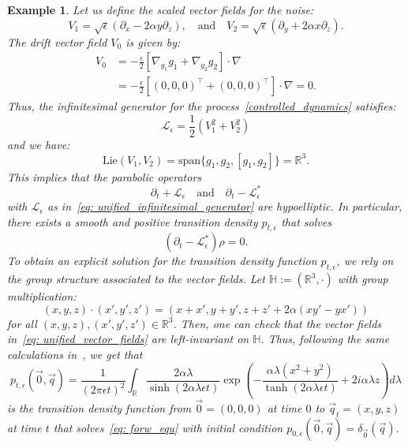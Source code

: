 \documentclass{amsart}
\newtheorem{example}[theorem]{Example}
\numberwithin{equation}{section}
\begin{document}
\begin{example}
{Let us define the scaled vector fields for the noise:
\begin{equation*}
V_1 = \sqrt{\epsilon}(\partial_x - 2\alpha y\partial_z), \quad\text{and}\quad 
V_2 = \sqrt{\epsilon}(\partial_y + 2\alpha x\partial_z).
\end{equation*}
The drift vector field $V_0$ is given by:
\begin{align*}
V_0 &= -\frac{\epsilon}{2}[\nabla_{g_1}g_1 + \nabla_{g_2}g_2]\cdot\nabla \\
&= -\frac{\epsilon}{2}[(0,0,0)^\top + (0,0,0)^\top]\cdot\nabla = 0.
\end{align*}
Thus, the infinitesimal generator for the process~\eqref{controlled_dynamics} satisfies:
\begin{equation}\label{eq: unified_infinitesimal_generator}
\mathcal{L}_\epsilon = \frac12(V_1^2 + V_2^2)
\end{equation}
and we have:
\[
\mathrm{Lie}(V_1,V_2) = \mathrm{span}\{g_1, g_2, [g_1,g_2]\} = \mathbb{R}^3.
\]
This implies that the parabolic operators
\[
\partial_t + \mathcal{L}_\epsilon
\quad\text{and}\quad
\partial_t - \mathcal{L}_\epsilon^*
\]
with $\mathcal{L}_\epsilon$ as in~\eqref{eq: unified_infinitesimal_generator} are hypoelliptic.
In particular, there exists a smooth and positive transition density $p_{t,\epsilon}$ that solves 
\begin{equation}\label{eq: forw_equ}
(\partial_t - \mathcal{L}_\epsilon^*)\rho = 0.
\end{equation}
To obtain an explicit solution for the transition density function $p_{t,\epsilon}$, we rely on the group structure associated to the vector fields. Let $\mathbb{H}:=(\mathbb{R}^3,\cdot)$ with group multiplication:
\[
(x,y,z) \cdot (x',y',z') = (x + x', y + y', z + z' + 2\alpha(x y' - y x'))
\]
for all $(x,y,z),(x',y',z') \in \mathbb{R}^3$. Then, one can check that the  vector fields in~\eqref{eq: unified_vector_fields} are left-invariant on $\mathbb{H}$. Thus, following the same calculations in~\cite{barilari2012small,bonfiglioli2007stratified}, we get that
\begin{equation}
p_{t,\epsilon}(\vec{0}, \vec{q}) = \frac{1}{(2\pi \epsilon t)^2} \int_{\mathbb{R}} \frac{2\alpha\lambda}{\sinh(2\alpha\lambda \epsilon t)} 
\exp\left(-\frac{\alpha\lambda(x^2 + y^2)}{\tanh(2\alpha\lambda \epsilon t)} + 2i\alpha\lambda z\right) d\lambda
\end{equation}
is the transition density function from $\vec{0} = (0,0,0)$ at time $0$ to $\vec{q}_t = (x,y,z)$ at time $t$ that solves~\eqref{eq: forw_equ} with initial condition $p_{0,\epsilon}(\vec{0}, \vec{q}) = \delta_{\vec{0}}(\vec{q})$.
}
\end{example}
\end{document}
